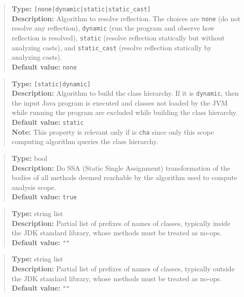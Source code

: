 \begin{quote}
{\bf Type:} {\tt [none|dynamic|static|static\_cast]} \\
{\bf Description:} Algorithm to resolve reflection.  The choices are {\tt none} (do not resolve any reflection),
{\tt dynamic} (run the program and observe how reflection is resolved),
{\tt static} (resolve reflection statically but without analyzing casts), and
{\tt static\_cast} (resolve reflection statically by analyzing casts). \\
{\bf Default value:} {\tt none}
\end{quote}

\begin{quote}
{\bf Type:} {\tt [static|dynamic]} \\
{\bf Description:} Algorithm to build the class hierarchy.  If it is {\tt dynamic}, then the input Java program is executed
and classes not loaded by the JVM while running the program are excluded while building the class hierarchy. \\
{\bf Default value:} {\tt static} \\
{\bf Note:} This property is relevant only if  is {\tt cha} since only this
scope computing algorithm queries the class hierarchy. 
\end{quote}

\begin{quote}
{\bf Type:} bool  \\
{\bf Description:} Do SSA (Static Single Assignment) transformation of the bodies of all methods deemed reachable by the algorithm used to compute analysis scope. \\
{\bf Default value:} {\tt true}
\end{quote}


\begin{quote}
{\bf Type:} string list \\
{\bf Description:} Partial list of prefixes of names of classes, typically inside the JDK standard library, whose methods must be treated as no-ops. \\
{\bf Default value:} {\tt ""}
\end{quote}

\begin{quote}
{\bf Type:} string list \\
{\bf Description:} Partial list of prefixes of names of classes, typically outside the JDK standard library, whose methods must be treated as no-ops. \\
{\bf Default value:} {\tt ""}
\end{quote}


